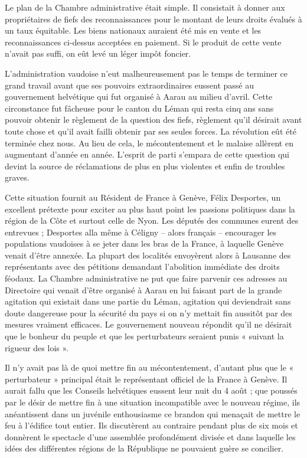 \documentclass[french,twoside]{book} %
\begin{document}
Le plan de la Chambre administrative était simple. Il consistait à donner aux propriétaires de fiefs des reconnaissances pour le montant de leurs droits évalués à un taux équitable. Les biens nationaux auraient été mis en vente et les reconnaissances ci-dessus acceptées en paiement. Si le produit de cette vente n’avait pas suffi, on eût levé un léger impôt foncier.\par
L’administration vaudoise n’eut malheureusement pas le temps de terminer ce grand travail avant que ses pouvoirs extraordinaires eussent passé au gouvernement helvétique qui fut organisé à Aarau au milieu d’avril. Cette circonstance fut fâcheuse pour le canton du Léman qui resta cinq ans sans pouvoir obtenir le règlement de la question des fiefs, règlement qu’il désirait avant toute chose et qu’il avait failli obtenir par ses seules forces. La révolution eût été terminée chez nous. Au lieu de cela, le mécontentement et le malaise allèrent en augmentant d’année en année. L’esprit de parti s’empara de cette question qui devint la source de réclamations de plus en plus violentes et enfin de troubles graves.\par
Cette situation fournit au Résident de France à Genève, Félix Desportes, un excellent prétexte pour exciter au plus haut point les passions politiques dans la région de la Côte et surtout celle de Nyon. Les députés des communes eurent des entrevues ; Desportes alla même à Céligny – alors français – encourager les populations vaudoises à se jeter dans les bras de la France, à laquelle Genève venait d’être annexée. La plupart des localités envoyèrent alors à Lausanne des représentants avec des pétitions demandant l’abolition immédiate des droits féodaux. La Chambre administrative ne put que faire parvenir ces adresses au Directoire qui venait d’être organisé à Aarau en lui faisant part de la grande agitation qui existait dans une partie du Léman, agitation qui deviendrait sans doute dangereuse pour la sécurité du pays si on n’y mettait fin aussitôt par des mesures vraiment efficaces. Le gouvernement nouveau répondit qu’il ne désirait que le bonheur du peuple et que les perturbateurs seraient punis « suivant la rigueur des lois ».\par
Il n’y avait pas là de quoi mettre fin au mécontentement, d’autant plus que le « perturbateur » principal était le représentant officiel de la France à Genève. Il aurait fallu que les Conseils helvétiques eussent leur nuit du 4 août ; que poussés par le désir de mettre fin à une situation incompatible avec le nouveau régime, ils anéantissent dans un juvénile enthousiasme ce brandon qui menaçait de mettre le feu à l’édifice tout entier. Ils discutèrent au contraire pendant plus de six mois et donnèrent le spectacle d’une assemblée profondément divisée et dans laquelle les idées des différentes régions de la République ne pouvaient guère se concilier.\par
\end{document}
